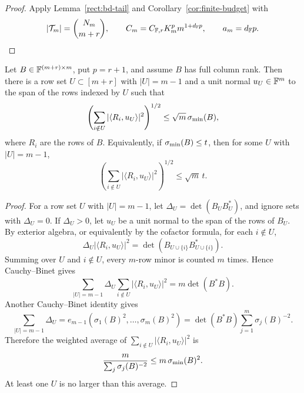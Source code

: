\begin{proof}
Apply Lemma~\ref{rect:bd-tail} and Corollary~\ref{cor:finite-budget} with
\[
  |\mathcal T_m|=\binom{N_m}{m+r},\qquad
  C_m=C_{\mathbb{F},r}K_m^p m^{1+d_{\mathbb{F}} p},\qquad
  a_m=d_{\mathbb{F}} p.
\]
\end{proof}

\begin{lemma}\label{rect:row-block-certificate}
Let \(B\in\mathbb{F}^{(m+r)\times m}\), put \(p=r+1\), and assume \(B\) has full column
rank.  Then there is a row set \(U\subset[m+r]\) with \(|U|=m-1\) and a unit
normal \(u_U\in\mathbb{F}^m\) to the span of the rows indexed by \(U\) such that
\[
  \left(\sum_{i\notin U}|\langle R_i,u_U\rangle|^2\right)^{1/2}
  \le \sqrt m\,\sigma_{\min}(B),
\]
where \(R_i\) are the rows of \(B\).  Equivalently, if
\(\sigma_{\min}(B)\le t\), then for some \(U\) with \(|U|=m-1\),
\[
  \left(\sum_{i\notin U}|\langle R_i,u_U\rangle|^2\right)^{1/2}
  \le \sqrt m\,t .
\]
\end{lemma}

\begin{proof}
For a row set \(U\) with \(|U|=m-1\), let
\(\Delta_U=\det(B_UB_U^*)\), and ignore sets with \(\Delta_U=0\).  If
\(\Delta_U>0\), let \(u_U\) be a unit normal to the span of the rows of \(B_U\).
By exterior algebra, or equivalently by the cofactor formula, for each
\(i\notin U\),
\[
  \Delta_U|\langle R_i,u_U\rangle|^2
  =\det(B_{U\cup\{i\}}B_{U\cup\{i\}}^*) .
\]
Summing over \(U\) and \(i\notin U\), every \(m\)-row minor is counted \(m\)
times.  Hence Cauchy--Binet gives
\[
  \sum_{|U|=m-1}\Delta_U\sum_{i\notin U}|\langle R_i,u_U\rangle|^2
  =
  m\det(B^*B).
\]
Another Cauchy--Binet identity gives
\[
  \sum_{|U|=m-1}\Delta_U
  = e_{m-1}(\sigma_1(B)^2,\ldots,\sigma_m(B)^2)
  =
  \det(B^*B)\sum_{j=1}^m\sigma_j(B)^{-2}.
\]
Therefore the weighted average of
\(\sum_{i\notin U}|\langle R_i,u_U\rangle|^2\) is
\[
  \frac{m}{\sum_j\sigma_j(B)^{-2}}
  \le m\,\sigma_{\min}(B)^2 .
\]
At least one \(U\) is no larger than this average.
\end{proof}

